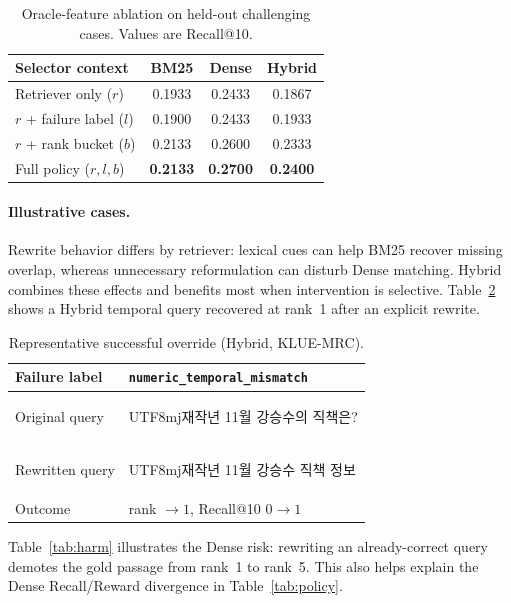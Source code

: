 \documentclass{article}
\begin{document}
\begin{table}[ht]
\centering
\caption{Oracle-feature ablation on held-out challenging cases. Values are Recall@10.}
\label{tab:oracle_ablation}
\small
\begin{tabular}{lccc}
\toprule
Selector context & BM25 & Dense & Hybrid \\
\midrule
Retriever only ($r$) & 0.1933 & 0.2433 & 0.1867 \\
$r$ + failure label ($l$) & 0.1900 & 0.2433 & 0.1933 \\
$r$ + rank bucket ($b$) & 0.2133 & 0.2600 & 0.2333 \\
Full policy ($r,l,b$) & \textbf{0.2133} & \textbf{0.2700} & \textbf{0.2400} \\
\bottomrule
\end{tabular}
\end{table}

\paragraph{Illustrative cases.}
Rewrite behavior differs by retriever: lexical cues can help BM25 recover
missing overlap, whereas unnecessary reformulation can disturb Dense matching.
Hybrid combines these effects and benefits most when intervention is selective.
Table~\ref{tab:success} shows a Hybrid temporal query recovered at rank~1 after
an explicit rewrite.

\begin{table}[h]
\centering
\caption{Representative successful override (Hybrid, KLUE-MRC).}
\label{tab:success}
\small
\begin{tabular}{ll}
\toprule
Failure label       & \texttt{numeric\_temporal\_mismatch} \\
\midrule
Original query      & \begin{CJK}{UTF8}{mj}재작년 11월 강승수의 직책은?\end{CJK} \\
Rewritten query     & \begin{CJK}{UTF8}{mj}재작년 11월 강승수 직책 정보\end{CJK} \\
\midrule
Outcome             & rank $\to 1$,\; Recall@10 $0 \to 1$ \\
\bottomrule
\end{tabular}
\end{table}

Table~\ref{tab:harm} illustrates the Dense risk: rewriting an already-correct
query demotes the gold passage from rank~1 to rank~5. This also helps explain
the Dense Recall/Reward divergence in Table~\ref{tab:policy}.
\end{document}
